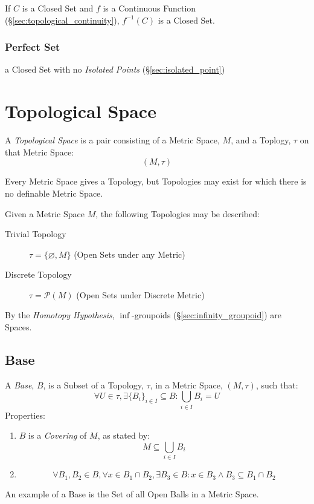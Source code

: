 If $C$ is a Closed Set and $f$ is a Continuous Function
(\S\ref{sec:topological_continuity}), $f^{-1}(C)$ is a Closed Set.



\subsubsection{Perfect Set}

a Closed Set with no \emph{Isolated Points}
(\S\ref{sec:isolated_point})



\section{Topological Space}\label{sec:topological_space}

A \emph{Topological Space} is a pair consisting of a Metric Space,
$M$, and a Toplogy, $\tau$ on that Metric Space:
\[
    (M,\tau)
\]

Every Metric Space gives a Topology, but Topologies may exist for
which there is no definable Metric Space. %

Given a Metric Space $M$, the following Topologies may be described:
\begin{description}
\item[Trivial Topology] $\tau = \{\varnothing, M\}$ (Open Sets under
  any Metric)

\item[Discrete Topology] $\tau = \mathcal{P}(M)$ (Open Sets under
  Discrete Metric)
\end{description}

By the \emph{Homotopy Hypothesis}, $\inf$-groupoids
(\S\ref{sec:infinity_groupoid}) are Spaces.



\subsection{Base}\label{sec:topological_base}

A \emph{Base}, $B$, is a Subset of a Topology, $\tau$, in a Metric
Space, $(M,\tau)$, such that:
\[
    \forall U \in \tau, \exists \{B_i\}_{i \in I} \subseteq B :
    \bigcup_{i \in I}B_i = U
\]
Properties:
\begin{enumerate}
    \item $B$ is a \emph{Covering} of $M$, as stated by:
\[
    M \subseteq \bigcup_{i \in I} B_i
\]

    \item
\[
    \forall B_1, B_2 \in B, \forall x \in B_1 \cap B_2,
    \exists B_3 \in B : x \in B_3 \wedge B_3 \subseteq B_1 \cap B_2
\]

\end{enumerate}
An example of a Base is the Set of all Open Balls in a Metric Space.

